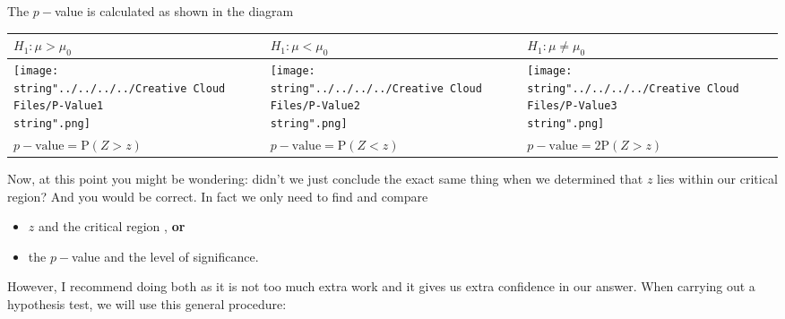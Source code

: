 \documentclass[11pt,a4paper]{book}
\begin{document}
\newpage

The $p-$value is calculated as shown in the diagram

\medskip

\setlength{\extrarowheight}{2pt}%
\begin{tabular}{|>{\centering}p{5cm}|>{\centering}p{5cm}|>{\centering}p{5cm}|}
\hline 
$H_{1}:\mu>\mu_{0}$ & $H_{1}:\mu<\mu_{0}$ & $H_{1}:\mu\neq\mu_{0}$\tabularnewline
\hline 
\centering{}\texttt{[image: \\string"../../../../Creative Cloud Files/P-Value1\\string".png]} & \centering{}\texttt{[image: \\string"../../../../Creative Cloud Files/P-Value2\\string".png]} & \centering{}\texttt{[image: \\string"../../../../Creative Cloud Files/P-Value3\\string".png]}\tabularnewline
\hline 
$p-\text{value}=\text{P}\left(Z>z\right)$ & $p-\text{value}=\text{P}\left(Z<z\right)$ & $p-\text{value}=2\text{P}\left(Z>z\right)$\tabularnewline
\hline 
\end{tabular}

\bigskip

Now, at this point you might be wondering: didn't we just conclude
the exact same thing when we determined that $z$ lies within our
critical region? And you would be correct. In fact we only need to
find and compare
\begin{itemize}
\item $z$ and the critical region , \textbf{or}
\item the $p-$value and the level of significance.
\end{itemize}
However, I recommend doing both as it is not too much extra work
and it gives us extra confidence in our answer. When carrying out a hypothesis test, we will use this general procedure:

\medskip
\end{document}
